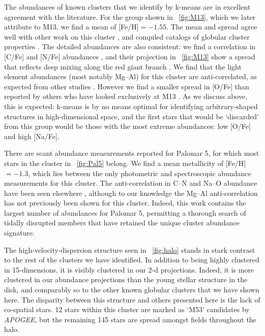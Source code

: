 \documentclass[12pt, letterpaper, preprint]{aastex}
\newcommand{\acronym}[1]{{\small{#1}}}
\newcommand{\project}[1]{\textsl{#1}}
\newcommand{\apogee}{\project{\acronym{APOGEE}}}
\begin{document}
The abundances of known clusters that we identify by k-means are in
excellent agreement with the literature. For the group shown in \figurename~\ref{fig:M13},
which we later attribute to M13, we find a mean of [Fe/H]$ = -1.55$.
The mean and spread agree well with other work on this cluster
\citep{Kraft_1992,Cohen_Melendez_2005,Johnson_Pilachowski_2012}, and compiled catalogs of
globular cluster properties \citep[][accessed 2016]{Harris_1996}. The detailed abundances are also
consistent: we find a correlation in [C/Fe] and [N/Fe] abundances \citep{Smith_2005}, and their
projection in \figurename~\ref{fig:M13} show a spread that reflects deep mixing
along the red giant branch \citep{Briley_2004}. We find that the light element
abundances (most notably Mg--Al) for this cluster are anti-correlated, as
expected from other studies \citep[for example,][]{gratton}. However we find a
smaller spread in [O/Fe] than reported by others who have looked exclusively
at M13 \citep{Johnson_Pilachowski_2012}.  As we discuss above, this is expected:
k-means is by no means optimal for identifying arbitrary-shaped structures
in high-dimensional space, and the first stars that would be `discarded' from
this group would be those with the most extreme abundances: low [O/Fe] and
high [Na/Fe].

There are scant abundance measurements reported for Palomar 5, for which
most stars in the cluster in \figurename~\ref{fig:Pal5} belong. We find a mean
metallicity of [Fe/H]$ = -1.3$, which lies between the only
photometric \citep{Geisler_1997} and spectroscopic \citep{Smith_1985,Smith_2002} abundance
measurements for this cluster.  The anti-correlation in C--N and Na--O abundance
have been seen elsewhere \citep[][respectively]{Smith_1985,Smith_2002}, although
to our knowledge the Mg--Al anti-correlation has not previously been shown for this cluster.
Indeed, this work contains the largest number of abundances for Palomar 5,
permitting a thorough search of tidally disrupted members \citep[for example,][]{Kuzma_2015} 
that have retained the unique cluster abundance signature.

The high-velocity-dispersion structure seen in \figurename~\ref{fig:halo} stands
in stark contrast to the rest of the clusters we have identified. In
addition to being highly clustered in 15-dimensions, it is visibly
clustered in our 2-d projections. Indeed, it is more clustered in our
abundance projections than the young stellar structure in the disk,
and comparably so to the other known globular clusters that we have
shown here. The disparity between this structure and others presented
here is the lack of co-spatial stars. 12 stars within this cluster are
marked as `M53' candidates by \apogee, but the remaining 145 stars
are spread amongst fields throughout the halo.  
\end{document}
